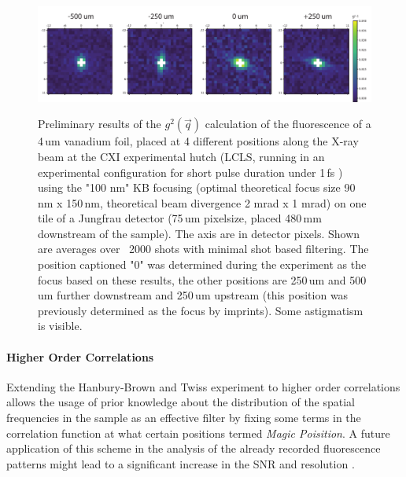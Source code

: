 \begin{figure}[p]
	\centering
	\includegraphics[width=\linewidth]{images/lv65_vanadium.pdf}
	\label{fig:outlook_vanadium}
	\caption[Focus finding using IDI]{Preliminary results of the $g^2(\vec{q})$ calculation of the fluorescence of a 4\,um vanadium foil, placed at 4 different positions along the X-ray beam at the CXI experimental hutch (LCLS, running in an experimental configuration for short pulse duration under 1\,fs \cite{subfs2017,argosecond}) using the "100 nm" KB focusing (optimal theoretical focus size 90\,nm x 150\,nm, theoretical beam divergence 2 mrad x 1 mrad) on one tile of a Jungfrau detector (75\,um pixelsize, placed 480\,mm downstream of the sample). The axis are in detector pixels. Shown are averages over ~2000 shots with minimal shot based filtering. The position captioned "0" was determined during the experiment as the focus based on these results, the other positions are 250\,um and 500\,um further downstream and 250\,um upstream (this position was previously determined as the focus by imprints).  Some astigmatism is visible.}
\end{figure}

\paragraph{Higher Order Correlations}

Extending the Hanbury-Brown and Twiss experiment to higher order correlations allows the usage of prior knowledge about the distribution of the spatial frequencies in the sample as an effective filter by fixing some terms in the correlation function at what certain positions termed  \textit{Magic Poisition}. A future application of this scheme in the analysis of the already recorded fluorescence patterns might lead to a significant increase in the SNR and resolution \cite{schneider2018,thiel2007}.